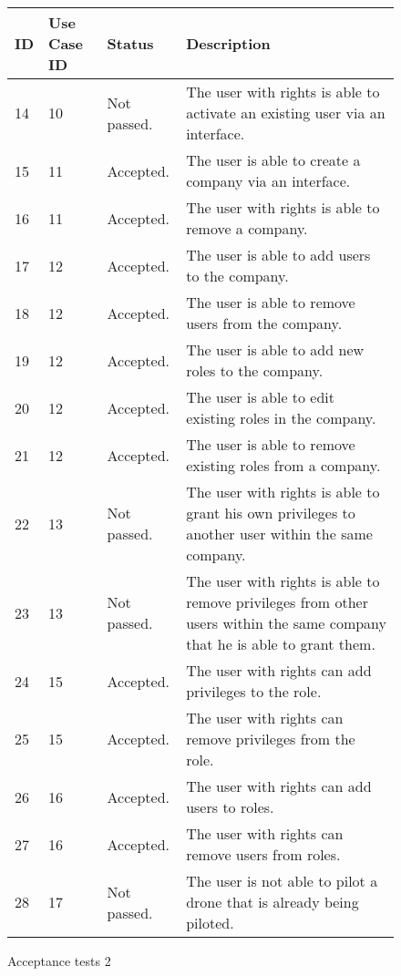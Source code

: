 \begin{figure}[htb]
\begin{center}
\begin{tabular}{ | l | l | l | p{8cm} | }
  \hline
	\textbf{ID} & \textbf{Use Case ID} & \textbf{Status} & \textbf{Description} \\ \hline
	14 & 10 & Not passed. & The user with rights is able to activate an existing user via an interface.  \\ \hline
	15 & 11 & Accepted. & The user is able to create a company via an interface.  \\ \hline
	16 & 11 & Accepted. & The user with rights is able to remove a company. \\ \hline
	17 & 12 & Accepted. & The user is able to add users to the company.   \\ \hline
	18 & 12 & Accepted. & The user is able to remove users from the company.  \\ \hline
	19 & 12 & Accepted. & The user is able to add new roles to the company.  \\ \hline
	20 & 12 & Accepted. & The user is able to edit existing roles in the company.  \\ \hline
	21 & 12 & Accepted. & The user is able to remove existing roles from a company.  \\ \hline
	22 & 13 & Not passed. & The user with rights is able to grant his own privileges to another user within the same company.  \\ \hline
	23 & 13 & Not passed. & The user with rights is able to remove privileges from other users within the same company that he is able to grant them.  \\ \hline
	24 & 15 & Accepted. & The user with rights can add privileges to the role.  \\ \hline
	25 & 15 & Accepted. & The user with rights can remove privileges from the role.  \\ \hline
	26 & 16 & Accepted. & The user with rights can add users to roles.  \\ \hline
	27 & 16 & Accepted. & The user with rights can remove users from roles.  \\ \hline
	28 & 17 & Not passed. & The user is not able to pilot a drone that is already being piloted. \\
  \hline
\end{tabular}
\caption{Acceptance tests 2}
\label{tab:acceptance_tests2_results}
\end{center}
\end{figure}


